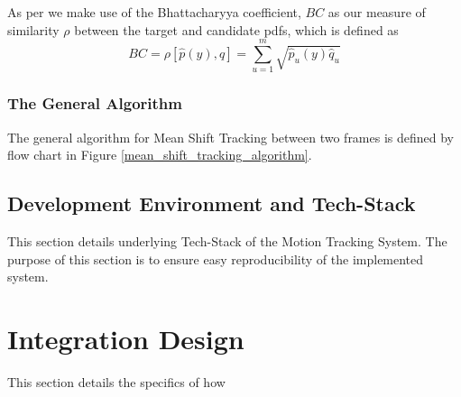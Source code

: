 As per \cite{Comaniciu2003} we make use of the Bhattacharyya coefficient, $BC$ as our
measure of similarity $\rho$ between the target and candidate pdfs, which is
defined as
\begin{equation}
    BC = \rho[\hat{p}(y),\hat{q}]=\sum_{u=1}^{m}\sqrt{\hat{p}_u(y)\hat{q}_u}
\end{equation}

\subsubsection{The General Algorithm}
The general algorithm for Mean Shift Tracking between two frames is defined by
flow chart in Figure \ref{mean_shift_tracking_algorithm}. 


\subsection{Development Environment and Tech-Stack}
This section details underlying Tech-Stack of the Motion Tracking System. The
purpose of this section is to ensure easy reproducibility of the implemented
system.

\subsubsection{}

\section{Integration Design}
This section details the specifics of how 






